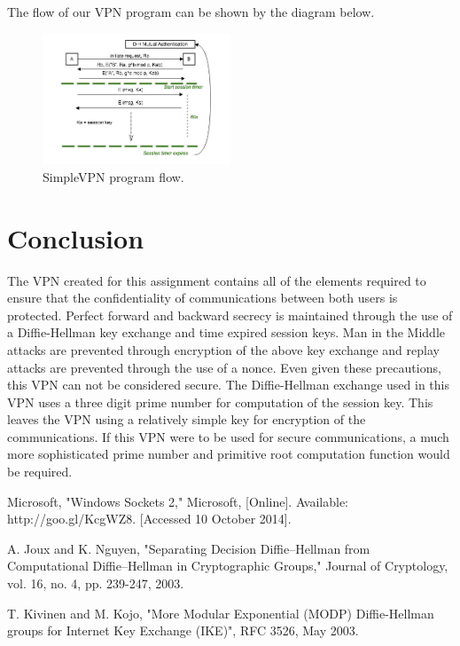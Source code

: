 \documentclass[journal]{IEEEtran}
\begin{document}
The flow of our VPN program can be shown by the diagram below.
\begin{figure}[H]
	\centering
	\caption{SimpleVPN program flow.}	
	\includegraphics[width=0.5\textwidth]{flow_diagram.png}
\end{figure}

\section{Conclusion}
The VPN created for this assignment contains all of the elements required to ensure that the confidentiality of communications between both users is protected. Perfect forward and backward secrecy is maintained through the use of a Diffie-Hellman key exchange and time expired session keys. Man in the Middle attacks are prevented through encryption of the above key exchange and replay attacks are prevented through the use of a nonce. Even given these precautions, this VPN can not be considered secure. The Diffie-Hellman exchange used in this VPN uses a three digit prime number for computation of the session key. This leaves the VPN using a relatively simple key for encryption of the communications. If this VPN were to be used for secure communications, a much more sophisticated prime number and primitive root computation function would be required.


\begin{thebibliography}{1}

Microsoft, "Windows Sockets 2," Microsoft, [Online]. Available: http://goo.gl/KcgWZ8. [Accessed 10 October 2014].

A. Joux and K. Nguyen, "Separating Decision Diffie–Hellman from Computational Diffie–Hellman in Cryptographic Groups," Journal of Cryptology, vol. 16, no. 4, pp. 239-247, 2003.

T. Kivinen and M. Kojo, "More Modular Exponential (MODP) Diffie-Hellman groups for Internet Key Exchange (IKE)", RFC 3526, May 2003. 

\end{thebibliography}
\end{document}
